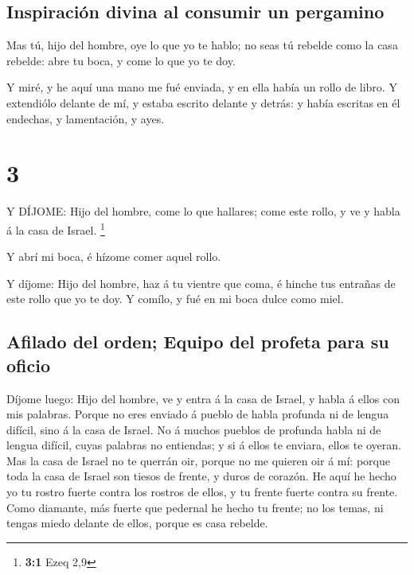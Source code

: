 \hypertarget{inspiraciuxf3n-divina-al-consumir-un-pergamino}{%
\subsection{Inspiración divina al consumir un
pergamino}\label{inspiraciuxf3n-divina-al-consumir-un-pergamino}}

 Mas tú, hijo del hombre, oye lo que yo te hablo; no seas tú
rebelde como la casa rebelde: abre tu boca, y come lo que yo te doy.

 Y miré, y he aquí una mano me fué enviada, y en ella había
un rollo de libro.  Y extendiólo delante de mí, y estaba
escrito delante y detrás: y había escritas en él endechas, y
lamentación, y ayes.

\hypertarget{section-2}{%
\section{3}\label{section-2}}

 Y DÍJOME: Hijo del hombre, come lo que hallares; come este
rollo, y ve y habla á la casa de Israel. \footnote{\textbf{3:1} Ezeq 2,9}

 Y abrí mi boca, é hízome comer aquel rollo.

 Y díjome: Hijo del hombre, haz á tu vientre que coma, é
hinche tus entrañas de este rollo que yo te doy. Y comílo, y fué en mi
boca dulce como miel.

\hypertarget{afilado-del-orden-equipo-del-profeta-para-su-oficio}{%
\subsection{Afilado del orden; Equipo del profeta para su
oficio}\label{afilado-del-orden-equipo-del-profeta-para-su-oficio}}

 Díjome luego: Hijo del hombre, ve y entra á la casa de
Israel, y habla á ellos con mis palabras.  Porque no eres
enviado á pueblo de habla profunda ni de lengua difícil, sino á la casa
de Israel.  No á muchos pueblos de profunda habla ni de
lengua difícil, cuyas palabras no entiendas; y si á ellos te enviara,
ellos te oyeran.  Mas la casa de Israel no te querrán oir,
porque no me quieren oir á mí: porque toda la casa de Israel son tiesos
de frente, y duros de corazón.  He aquí he hecho yo tu
rostro fuerte contra los rostros de ellos, y tu frente fuerte contra su
frente.  Como diamante, más fuerte que pedernal he hecho tu
frente; no los temas, ni tengas miedo delante de ellos, porque es casa
rebelde.


